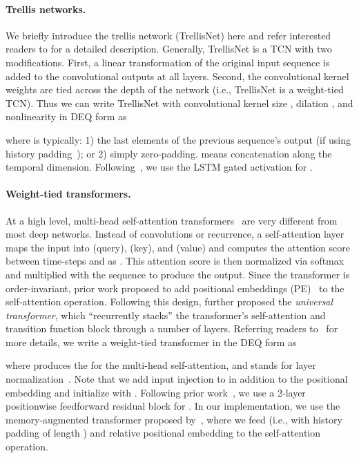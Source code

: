 \documentclass{article}
\begin{document}
\paragraph{Trellis networks.} We briefly introduce the trellis network (TrellisNet) here and refer interested readers to \cite{bai2018trellis} for a detailed description. Generally, TrellisNet is a TCN with two modifications. First, a linear transformation of the original input sequence  is added to the convolutional outputs at all layers. Second, the convolutional kernel weights are tied across the depth of the network (i.e., TrellisNet is a weight-tied TCN). Thus we can write TrellisNet with convolutional kernel size , dilation , and nonlinearity  in DEQ form as

where  is typically: 1) the last  elements of the previous sequence's output (if using history padding~\citep{bai2018trellis}); or 2) simply zero-padding.  means concatenation along the temporal dimension. Following~\cite{bai2018trellis}, we use the LSTM gated activation for .
\vspace{-2mm}

\paragraph{Weight-tied transformers.} At a high level, multi-head self-attention transformers~\citep{vaswani2017attention} are very different from most deep networks. Instead of convolutions or recurrence, a self-attention layer maps the input into  (query),  (key), and  (value) and computes the attention score between time-steps  and  as . This attention score is then normalized via softmax and multiplied with the  sequence to produce the output. Since the transformer is order-invariant, prior work proposed to add positional embeddings (PE)~\citep{vaswani2017attention,dai2018transformer} to the self-attention operation. Following this design, \cite{dehghani2018universal} further proposed the \emph{universal transformer}, which ``recurrently stacks'' the transformer's self-attention and transition function block  through a number of layers. Referring readers to~\cite{vaswani2017attention,dai2018transformer,dehghani2018universal} for more details, we write a weight-tied transformer in the DEQ form as

where  produces the  for the multi-head self-attention, and  stands for layer normalization~\citep{Ba2016layer}. Note that we add input injection  to  in addition to the positional embedding and initialize with . Following prior work~\citep{vaswani2017attention,devlin2018bert,dai2018transformer,dehghani2018universal}, we use a 2-layer positionwise feedforward residual block for . In our implementation, we use the memory-augmented transformer proposed by~\cite{dai2018transformer}, where we feed  (i.e., with history padding of length ) and relative positional embedding  to the self-attention operation.
\end{document}
